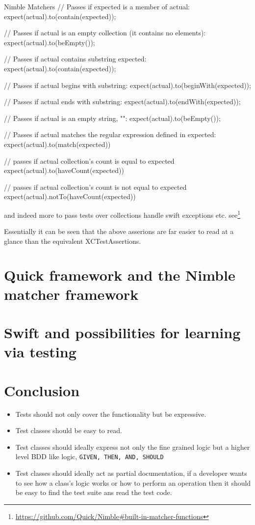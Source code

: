 \documentclass[a4paper, titlepage]{article}
\begin{document}
\begin{listbox}{1}{Nimble Matchers}
// Passes if expected is a member of actual:
expect(actual).to(contain(expected));

// Passes if actual is an empty collection (it contains no elements):
expect(actual).to(beEmpty());

// Passes if actual contains substring expected:
expect(actual).to(contain(expected));

// Passes if actual begins with substring:
expect(actual).to(beginWith(expected));

// Passes if actual ends with substring:
expect(actual).to(endWith(expected));

// Passes if actual is an empty string, "":
expect(actual).to(beEmpty());

// Passes if actual matches the regular expression defined in expected:
expect(actual).to(match(expected))

// passes if actual collection's count is equal to expected
expect(actual).to(haveCount(expected))

// passes if actual collection's count is not equal to expected
expect(actual).notTo(haveCount(expected))
\end{listbox}

and indeed more to pass tests over collections handle swift exceptions
etc. see\footnote{\url{https://github.com/Quick/Nimble#built-in-matcher-functions}} 

Essentially it can be seen that the above asserions are far easier to
read at a glance than the equivalent XCTestAssertions.

\section{Quick framework and the Nimble matcher framework}
\section{Swift and possibilities for learning via testing}
\section{Conclusion}
  \begin{itemize}
  \item{Tests should not only cover the functionality but be
    expressive.}

  \item{Test classes should be easy to read.}
  \item{Test classes should ideally express not only the fine grained
    logic but a higher level BDD like logic, \texttt{GIVEN, THEN, AND, SHOULD}}
  \item{Test classes should ideally act as partial documentation, if a
  developer wants to see how a class's logic works or how to perform an
  operation then it should be easy to find the test suite ans read the
  test code.}
\end{itemize}
\end{document}

